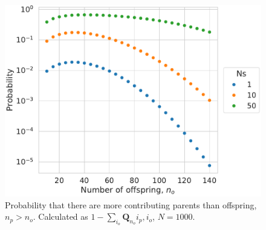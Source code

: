 \documentclass[review]{elsarticle}
\begin{document}
\begin{figure}
  \centering
  \includegraphics[width=\textwidth]{fig/missing.pdf}
  \caption{Probability that there are more contributing parents than offspring, $n_p > n_o$.
    Calculated as $1-\sum_{i_o} \mathbf{Q}_{n_o}{i_p, i_o}$, $N=1000$.}
  \label{fig_apx_missing}
\end{figure}


\end{document}
